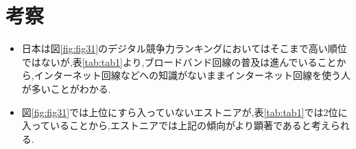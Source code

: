 \documentclass[a4paper,11pt,dvipdfmx]{ujarticle}
\begin{document}
\section{考察}
\begin{itemize}
    \item 日本は図\ref{fig:fig31}のデジタル競争力ランキングにおいてはそこまで高い順位ではないが,表\ref{tab:tab1}より,ブロードバンド回線の普及は進んでいることから,インターネット回線などへの知識がないままインターネット回線を使う人が多いことがわかる.
    \item 図\ref{fig:fig31}では上位にすら入っていないエストニアが,表\ref{tab:tab1}では2位に入っていることから,エストニアでは上記の傾向がより顕著であると考えられる.
\end{itemize}




\end{document}
